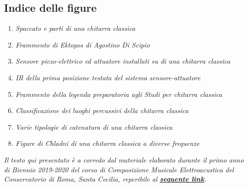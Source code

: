 \documentclass[oneside]{article}
\begin{document}
\begin{multicols*}{2}
\section{ Indice delle figure}
\hspace*{10mm}

\begin{enumerate}

\item \emph{Spaccato e parti di una chitarra classica}\newline
\item \emph{Frammento di \textit{Ektopos} di Agostino Di Scipio}\newline
\item \emph{Sensore piezo-elettrico ed attuatore installati su di una chitarra classica}\newline
\item \emph{IR della prima posizione testata del sistema sensore-attuatore}\newline
\item \emph{Frammento della legenda preparatoria agli Studi per chitarra classica}\newline
\item \emph{Classificazione dei luoghi percussivi della chitarra classica}\newline
\item \emph{Varie tipologie di \textit{catenatura} di una chitarra classica}\newline
\item \emph{Figure di Chladni di una chitarra classica a diverse frequenze}\newline

\end{enumerate}

\end{multicols*}

\textit{Il testo qui presentato è a corredo dal materiale elaborato durante il primo anno di Biennio 2019-2020 del corso di Composizione Musicale Elettroacustica del Conservatorio di Roma, Santa Cecilia, reperibile al \textbf{\href{https://github.com/SMERM/BN-Tedesco/}{seguente link}}.}
\end{document}
